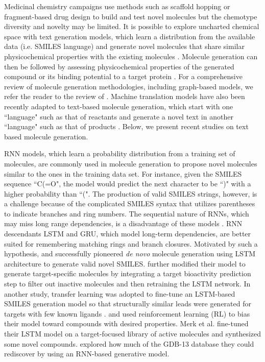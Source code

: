 \documentclass[review]{elsarticle}
\begin{document}
Medicinal chemistry campaigns use methods such as scaffold hopping \cite{grisoni2018scaffold} or fragment-based drug design \cite{sledz2018protein} to build and test novel molecules but the chemotype diversity and novelty may be limited. It is possible to explore uncharted chemical space with text generation models, which learn a distribution from the available data  (i.e. SMILES language) and generate novel molecules that share similar physicochemical properties with the existing molecules \cite{segler2017generating}. Molecule generation can then be followed by assessing physicochemical properties of the generated compound or its binding potential to a target protein \cite{segler2017generating}. For a comprehensive review of molecule generation methodologies, including graph-based models, we refer the reader to the review of \citet{elton2019deep}. Machine translation models have also been recently adapted to text-based molecule generation, which start with one ``language" such as that of reactants and generate a novel text in another ``language" such as that of products \cite{schwaller2018molecular}. Below, we present recent studies on text based molecule generation.

RNN models, which learn a probability distribution from a training set of molecules, are commonly used in molecule generation to propose novel molecules similar to the ones in the training data set. For instance, given the SMILES sequence ``C(=O", the model would predict the next character to be ``)" with a higher probability than ``(". The production of valid SMILES strings, however, is a challenge because of the complicated SMILES syntax that utilizes parentheses to indicate branches and ring numbers. The sequential nature of RNNs, which may miss long range dependencies, is a disadvantage of these models \cite{segler2017generating}. RNN descendants LSTM and GRU, which model long-term dependencies, are better suited for remembering matching rings and branch closures. Motivated by such a hypothesis,  \citet{segler2017generating} and \citet{ertl2017silico} successfully pioneered \textit{de novo} molecule generation using LSTM architecture to generate valid novel SMILES. \citet{segler2017generating} further modified their model to generate target-specific molecules by integrating a target bioactivity prediction step to filter out inactive molecules and then retraining the LSTM network.  In another study, transfer learning was adopted to fine-tune an LSTM-based SMILES generation model so that structurally similar leads were generated for targets with few known ligands  \cite{gupta2018generative}. \citet{olivecrona2017molecular} and \citet{popova2018deep} used reinforcement learning (RL) to bias their model toward compounds with desired properties. Merk et al. \cite{merk2018novo, merk2018tuning} fine-tuned their LSTM model on a target-focused library of active molecules and synthesized some novel compounds. \citet{arus2019exploring} explored how much of the GDB-13 database \cite{blum2009970} they could rediscover by using an RNN-based generative model. 
\end{document}
